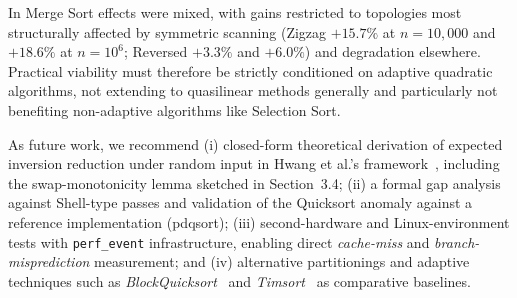 \documentclass[namedate,webpdf,contemporary,large]{TBench-template}%
\theoremstyle{thmstyleone}%
\theoremstyle{thmstyletwo}%
\theoremstyle{thmstylethree}%
\begin{document}
In Merge Sort effects were mixed, with gains restricted to topologies most structurally affected by symmetric scanning (Zigzag $+15.7\%$ at $n{=}10{,}000$ and $+18.6\%$ at $n{=}10^6$; Reversed $+3.3\%$ and $+6.0\%$) and degradation elsewhere. Practical viability must therefore be strictly conditioned on adaptive quadratic algorithms, not extending to quasilinear methods generally and particularly not benefiting non-adaptive algorithms like Selection Sort.

As future work, we recommend (i) closed-form theoretical derivation of expected inversion reduction under random input in Hwang et al.'s framework~\cite{hwang_presorting_2000}, including the swap-monotonicity lemma sketched in Section~3.4; (ii) a formal gap analysis against Shell-type passes and validation of the Quicksort anomaly against a reference implementation (pdqsort); (iii) second-hardware and Linux-environment tests with \texttt{perf\_event} infrastructure, enabling direct \emph{cache-miss} and \emph{branch-misprediction} measurement; and (iv) alternative partitionings and adaptive techniques such as \emph{BlockQuicksort}~\cite{edelkamp_blockquicksort_2016} and \emph{Timsort}~\cite{auger_timsort_2018} as comparative baselines.



\end{document}
